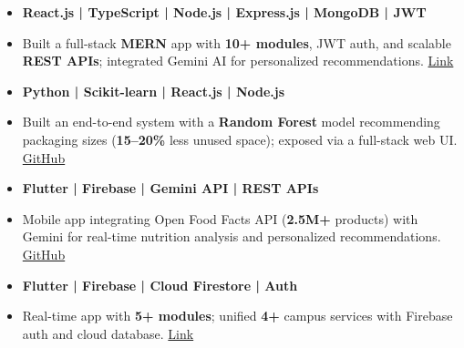 

\begin{itemize}
\item \textbf{React.js | TypeScript | Node.js | Express.js | MongoDB | JWT}
\item Built a full-stack \textbf{MERN} app with \textbf{10+ modules}, JWT auth, and scalable \textbf{REST APIs}; integrated Gemini AI for personalized recommendations.
\href{https://github.com/bushra931/veloura-dream-studio}{Link}
\end{itemize}

\smallskip
{}
\begin{itemize}
\item \textbf{Python | Scikit-learn | React.js | Node.js}
\item Built an end-to-end system with a \textbf{Random Forest} model recommending packaging sizes (\textbf{15--20\%} less unused space); exposed via a full-stack web UI.
\href{https://github.com/bushra931/Packify}{GitHub}
\end{itemize}

\smallskip
{}
\begin{itemize}
\item \textbf{Flutter | Firebase | Gemini API | REST APIs}
\item Mobile app integrating Open Food Facts API (\textbf{2.5M+} products) with Gemini for real-time nutrition analysis and personalized recommendations.
\href{https://github.com/bushra931/EveryBitee}{GitHub}
\end{itemize}

\smallskip
{}
\begin{itemize}
\item \textbf{Flutter | Firebase | Cloud Firestore | Auth}
\item Real-time app with \textbf{5+ modules}; unified \textbf{4+} campus services with Firebase auth and cloud database.
\href{https://drive.google.com/drive/folders/1jirF40swqdENVyWvGIHZ0Cer_0GMrklP}{Link}
\end{itemize}
